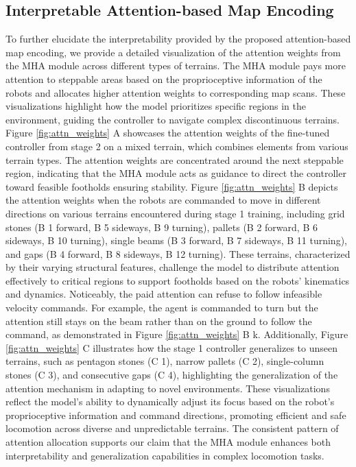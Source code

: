 \documentclass[9pt,twocolumn,twoside]{osajnl}
\begin{document}
\subsection{Interpretable Attention-based Map Encoding}
To further elucidate the interpretability provided by the proposed attention-based map encoding, we provide a detailed visualization of the attention weights from the MHA module across different types of terrains. The MHA module pays more attention to steppable areas based on the proprioceptive information of the robots and allocates higher attention weights to corresponding map scans. These visualizations highlight how the model prioritizes specific regions in the environment, guiding the controller to navigate complex discontinuous terrains. Figure \ref{fig:attn_weights} A showcases the attention weights of the fine-tuned controller from stage 2 on a mixed terrain, which combines elements from various terrain types. The attention weights are concentrated around the next steppable region, indicating that the MHA module acts as guidance to direct the controller toward feasible footholds ensuring stability. Figure \ref{fig:attn_weights} B depicts the attention weights when the robots are commanded to move in different directions on various terrains encountered during stage 1 training, including grid stones (B 1 forward, B 5 sideways, B 9 turning), pallets (B 2 forward, B 6 sideways, B 10 turning), single beams (B 3 forward, B 7 sideways, B 11 turning), and gaps (B 4 forward, B 8 sideways, B 12 turning). These terrains, characterized by their varying structural features, challenge the model to distribute attention effectively to critical regions to support footholds based on the robots' kinematics and dynamics. Noticeably, the paid attention can refuse to follow infeasible velocity commands. For example, the agent is commanded to turn but the attention still stays on the beam rather than on the ground to follow the command, as demonstrated in Figure \ref{fig:attn_weights} B k. Additionally, Figure \ref{fig:attn_weights} C illustrates how the stage 1 controller generalizes to unseen terrains, such as pentagon stones (C 1), narrow pallets (C 2), single-column stones (C 3), and consecutive gaps (C 4), highlighting the generalization of the attention mechanism in adapting to novel environments. These visualizations reflect the model’s ability to dynamically adjust its focus based on the robot's proprioceptive information and command directions, promoting efficient and safe locomotion across diverse and unpredictable terrains. The consistent pattern of attention allocation supports our claim that the MHA module enhances both interpretability and generalization capabilities in complex locomotion tasks.\\
\end{document}
